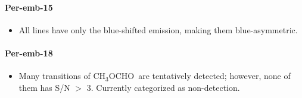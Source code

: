 \documentclass[twocolumn]{aastex62}
\newcommand{\kms}{\mbox{\,km\,s$^{-1}$}}
\newcommand{\methylformate}{\mbox{CH$_{3}$OCHO}}
\begin{document}

\paragraph{Per-emb-15}
\begin{itemize}
  \item All lines have only the blue-shifted emission, making them blue-asymmetric.
\end{itemize}


\paragraph{Per-emb-18}
\begin{itemize}
  \item Many transitions of \methylformate\ are tentatively detected; however, none of them has S/N $>$ 3.  Currently categorized as non-detection.
\end{itemize}


\end{document}
